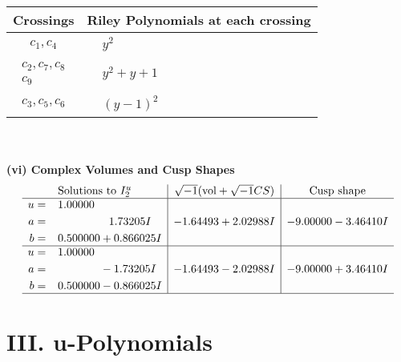 \documentclass[1p]{elsarticle_modified}
\theoremstyle{definition}
\newcommand{\I}{\sqrt{-1}}
\begin{document}
\begin{tabular}{m{50pt}|m{274pt}}
Crossings & \hspace{64pt}Riley Polynomials at each crossing \\
\hline $$\begin{aligned}c_{1},c_{4}\end{aligned}$$&$\begin{aligned}
&y^2
\end{aligned}$\\
\hline $$\begin{aligned}c_{2},c_{7},c_{8}\\c_{9}\end{aligned}$$&$\begin{aligned}
&y^2+y+1
\end{aligned}$\\
\hline $$\begin{aligned}c_{3},c_{5},c_{6}\end{aligned}$$&$\begin{aligned}
&(y-1)^2
\end{aligned}$\\
\hline
\end{tabular}\\~\\
\newpage\flushleft \textbf{(vi) Complex Volumes and Cusp Shapes}
$$\begin{array}{c|c|c}  
\text{Solutions to }I^u_{2}& \I (\text{vol} + \sqrt{-1}CS) & \text{Cusp shape}\\
 \hline 
\begin{aligned}
u &= \phantom{-}1.00000\phantom{ +0.000000I} \\
a &= \phantom{-0.000000 -}1.73205 I \\
b &= \phantom{-}0.500000 + 0.866025 I\end{aligned}
 & -1.64493 + 2.02988 I & -9.00000 - 3.46410 I \\ \hline\begin{aligned}
u &= \phantom{-}1.00000\phantom{ +0.000000I} \\
a &= \phantom{-0.000000 } -1.73205 I \\
b &= \phantom{-}0.500000 - 0.866025 I\end{aligned}
 & -1.64493 - 2.02988 I & -9.00000 + 3.46410 I\\
 \hline 
 \end{array}$$\newpage
\newpage\renewcommand{\arraystretch}{1}
\centering \section*{ III. u-Polynomials}
\end{document}

